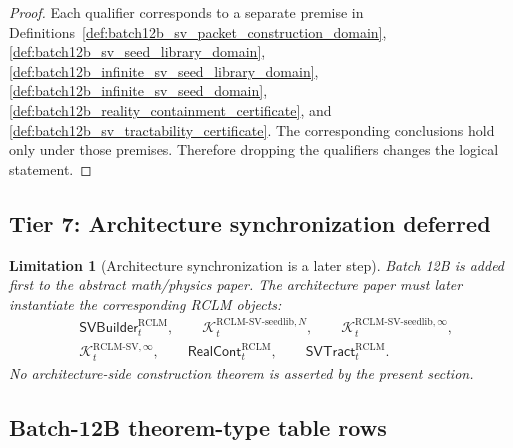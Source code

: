\documentclass[11pt]{article}
\newtheorem{limitation}[theorem]{Limitation}
\newcommand{\1}{\mathbf{1}}
\providecommand{\RCLM}{\mathrm{RCLM}}
\providecommand{\Kcal}{\mathcal{K}}
\begin{document}
\begin{proof}
Each qualifier corresponds to a separate premise in Definitions~\ref{def:batch12b_sv_packet_construction_domain}, \ref{def:batch12b_sv_seed_library_domain}, \ref{def:batch12b_infinite_sv_seed_library_domain}, \ref{def:batch12b_infinite_sv_seed_domain}, \ref{def:batch12b_reality_containment_certificate}, and \ref{def:batch12b_sv_tractability_certificate}.  The corresponding conclusions hold only under those premises.  Therefore dropping the qualifiers changes the logical statement.
\end{proof}

\subsection{Tier 7: Architecture synchronization deferred}

\begin{limitation}[Architecture synchronization is a later step]
\label{lim:batch12b_architecture_sync_deferred}
Batch 12B is added first to the abstract math/physics paper.  The architecture paper must later instantiate the corresponding RCLM objects:
\[
\begin{aligned}
&\mathsf{SVBuilder}_t^{\RCLM},
\qquad
\Kcal_t^{\RCLM\text{-}\mathrm{SV\mbox{-}seedlib},N},
\qquad
\Kcal_t^{\RCLM\text{-}\mathrm{SV\mbox{-}seedlib},\infty},\\
&\Kcal_t^{\RCLM\text{-}\mathrm{SV},\infty},
\qquad
\mathsf{RealCont}_t^{\RCLM},
\qquad
\mathsf{SVTract}_t^{\RCLM}.
\end{aligned}
\]
No architecture-side construction theorem is asserted by the present section.
\end{limitation}

\subsection{Batch-12B theorem-type table rows}
\end{document}
